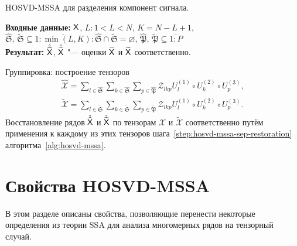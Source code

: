 \documentclass[specialist,
    substylefile = spbu.rtx,
    subf,href,colorlinks=true, 12pt]{disser}
\theoremstyle{plain}
\theoremstyle{definition}
\theoremstyle{remark}
\newcommand{\Input}{\textbf{Входные данные: }}
\newcommand{\Output}{\textbf{Результат: }}
\begin{document}
    \begin{algorithm}[!ht]
        \caption{HOSVD-MSSA для разделения компонент сигнала.}
        \label{alg:hosvd-mssa-sep}
        \Input $\mathsf{X}$,
        $L: 1< L < N$, $K = N - L + 1$,
        $\widehat{\mathfrak{S}},\, \widetilde{\mathfrak{S}} \subseteq \overline{1:\min(L, K)}:
        \widehat{\mathfrak{S}} \cap \widetilde{\mathfrak{S}} = \varnothing$,
        $\widehat{\mathfrak{P}},\, \widetilde{\mathfrak{P}}  \subseteq \overline{1:P}$\\
        \Output $\mathring{\widehat{\mathsf{X}}}$, $\mathring{\widetilde{\mathsf{X}}}$ "--- оценки $\widehat{\mathsf{X}}$ и $\widetilde{\mathsf{X}}$
        соответственно.
        \begin{algorithmic}[1]
            \setcounter{ALG@line}{2}
            \State Группировка: построение тензоров
            \begin{gather*}
                \widehat{\mathcal{X}}=\sum_{l \in \widehat{\mathfrak{S}}} \sum_{k\in \widehat{\mathfrak{S}}}
                \sum_{p\in \widehat{\mathfrak{P}}}
                \mathcal{Z}_{lkp} U^{(1)}_{l}\circ U^{(2)}_{k} \circ U^{(3)}_{p},\\
                \widetilde{\mathcal{X}}=\sum_{l \in \widetilde{\mathfrak{S}}} \sum_{k\in \widetilde{\mathfrak{S}}}
                \sum_{p\in \widetilde{\mathfrak{P}}}
                \mathcal{Z}_{lkp} U^{(1)}_{l}\circ U^{(2)}_{k} \circ U^{(3)}_{p}.
            \end{gather*}
            \State Восстановление рядов $\mathring{\widehat{\mathsf{X}}}$ и $\mathring{\widetilde{\mathsf{X}}}$ по тензорам $\widehat{\mathcal{X}}$ и $\widetilde{\mathcal{X}}$ соответственно путём применения к
            каждому из этих тензоров шага~\ref{step:hosvd-mssa-sep-restoration} алгоритма~\ref{alg:hosvd-mssa}.
        \end{algorithmic}
    \end{algorithm}


    \section{Свойства HOSVD-MSSA}\label{sec:hosvd-mssa-properties}
    В этом разделе описаны свойства, позволяющие перенести некоторые определения из теории SSA для анализа многомерных
    рядов на тензорный случай.
\end{document}
